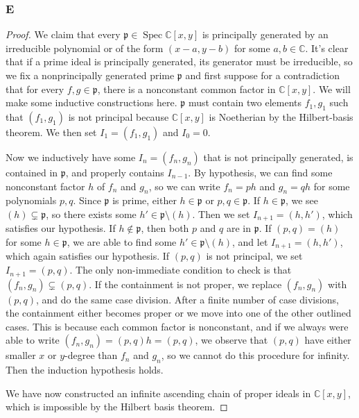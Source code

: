\documentclass{article}
\newcommand{\C}{\mathbb{C}}
\newcommand{\frkp}{\mathfrak{p}}
\DeclareMathOperator{\Spec}{\mathrm{Spec}}
\theoremstyle{definition} %
\begin{document}
\subsubsection{E}\label{3.2.E}
\begin{proof}
    We claim that every $\frkp\in \Spec \C[x,y]$ is principally generated by an irreducible polynomial or of the form $(x-a, y-b)$ for some $a,b\in \C$. It's clear that if a prime ideal is principally generated, its generator must be irreducible, so we fix a nonprincipally generated prime $\frkp$ and first suppose for a contradiction that for every $f,g\in \frkp$, there is a nonconstant common factor in $\C[x,y]$. We will make some inductive constructions here. $\frkp$ must contain two elements $f_1,g_1$ such that $(f_1,g_1)$ is not principal because $\C[x,y]$ is Noetherian by the Hilbert-basis theorem. We then set $I_1 = (f_1, g_1)$ and $I_0=0$.

    Now we inductively have some $I_n= (f_n, g_n)$ that is not principally generated, is contained in $\frkp$, and properly contains $I_{n-1}$. By hypothesis, we can find some nonconstant factor $h$ of $f_n$ and $g_n$, so we can write $f_n = p h $ and $g_n = q h$ for some polynomials $p, q$. Since $\frkp$ is prime, either $h\in \frkp$ or $p,q\in \frkp$. If $h\in \frkp$, we see $(h)\subsetneq \frkp$, so there exists some $h'\in \frkp \setminus (h)$. Then we set $I_{n+1}=(h,h')$, which satisfies our hypothesis. If $h\notin \frkp$, then both $p$ and $q$ are in $\frkp$. If $(p,q)=(h)$ for some $h\in \frkp$, we are able to find some $h'\in \frkp\setminus (h)$, and let $I_{n+1}=(h,h')$, which again satisfies our hypothesis. If $(p,q)$ is not principal, we set $I_{n+1}=(p,q)$. The only non-immediate condition to check is that $(f_n,g_n)\subsetneq (p,q)$. If the containment is not proper, we replace $(f_n,g_n)$ with $(p,q)$, and do the same case division. After a finite number of case divisions, the containment either becomes proper or we move into one of the other outlined cases. This is because each common factor is nonconstant, and if we always were able to write $(f_n, g_n)=(p,q)h=(p,q)$, we observe that $(p,q)$ have either smaller $x$ or $y$-degree than $f_n$ and $g_n$, so we cannot do this procedure for infinity. Then the induction hypothesis holds.

    We have now constructed an infinite ascending chain of proper ideals in $\C[x,y]$, which is impossible by the Hilbert basis theorem.


\end{proof}
\end{document}

